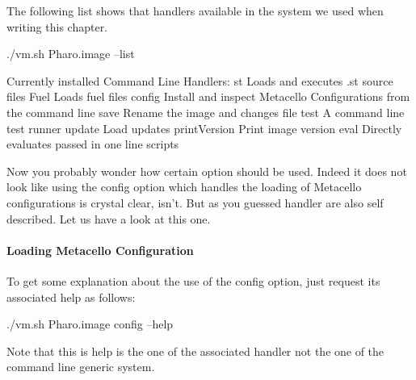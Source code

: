 \documentclass[a4paper,10pt,twoside]{book}
\begin{document}
The following list shows that handlers available in the system we used when writing this chapter.

\begin{code}{}
./vm.sh Pharo.image --list

Currently installed Command Line Handlers:
    st              Loads and executes .st source files
    Fuel            Loads fuel files
    config          Install and inspect Metacello Configurations from the command line
    save            Rename the image and changes file
    test            A command line test runner
    update          Load updates
    printVersion    Print image version
    eval            Directly evaluates passed in one line scripts
\end{code}

Now you probably wonder how certain option should be used. Indeed it does not look like using the config option which handles the loading of Metacello configurations is crystal clear, isn't. But as you guessed handler are also self described. Let us have a look at this one. 



\paragraph{Loading Metacello Configuration}
To get some explanation about the use of the config option, just request its associated help as follows: 
\begin{code}{}
./vm.sh Pharo.image config --help
\end{code}

Note that this is help is the one of the associated handler not the one of the command line generic system. 
\end{document}
